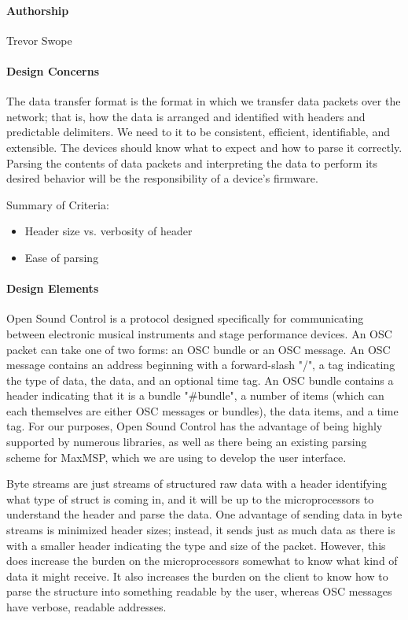 \documentclass[onecolumn, draftclsnofoot,10pt, compsoc]{IEEEtran}
\begin{document}
\paragraph{Authorship}
    Trevor Swope

\paragraph{Design Concerns}
    The data transfer format is the format in which we transfer data packets over the network; that is, how the data is  arranged and identified with headers and predictable delimiters. We need to it to be consistent, efficient, identifiable, and extensible. The devices should know what to expect and how to parse it correctly. Parsing the contents of data packets and interpreting the data to perform its desired behavior will be the responsibility of a device's firmware. 

    Summary of Criteria:
    \begin{itemize}[noitemsep,topsep=-10pt]
        \item Header size vs. verbosity of header
        \item Ease of parsing
    \end{itemize}

\paragraph{Design Elements}
    Open Sound Control \cite{OSC} is a protocol designed specifically for communicating between electronic musical instruments and stage performance devices. An OSC packet can take one of two forms: an OSC bundle or an OSC message. An OSC message contains an address beginning with a forward-slash "/", a tag indicating the type of data, the data, and an optional time tag. An OSC bundle contains a header indicating that it is a bundle "\#bundle", a number of items (which can each themselves are either OSC messages or bundles), the data items, and a time tag. For our purposes, Open Sound Control has the advantage of being highly supported by numerous libraries, as well as there being an existing parsing scheme for MaxMSP, which we are using to develop the user interface.

    Byte streams are just streams of structured raw data with a header identifying what type of struct is coming in, and it will be up to the microprocessors to understand the header and parse the data. One advantage of sending data in byte streams is minimized header sizes; instead, it sends just as much data as there is with a smaller header indicating the type and size of the packet. However, this does increase the burden on the microprocessors somewhat to know what kind of data it might receive. It also increases the burden on the client to know how to parse the structure into something readable by the user, whereas OSC messages have verbose, readable addresses.
\end{document}
